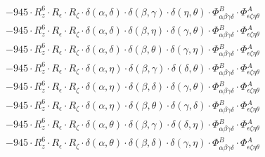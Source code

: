 \documentclass{article}
\begin{document}
\begin{equation}
\begin{array}{c}
 \\[0.2em] 		 - 945 \cdot R_{z}^{6} \cdot R_{\epsilon{}} \cdot R_{\zeta{}} \cdot \delta{}\left(\alpha{}, \delta{}\right) \cdot \delta{}\left(\beta{}, \gamma{}\right) \cdot \delta{}\left(\eta{}, \theta{}\right) \cdot \Phi{}^{B}_{\alpha{}\beta{}\gamma{}\delta{}} \cdot \Phi{}^{A}_{\epsilon{}\zeta{}\eta{}\theta{}} 
 \\[0.2em] 		 - 945 \cdot R_{z}^{6} \cdot R_{\epsilon{}} \cdot R_{\zeta{}} \cdot \delta{}\left(\alpha{}, \delta{}\right) \cdot \delta{}\left(\beta{}, \eta{}\right) \cdot \delta{}\left(\gamma{}, \theta{}\right) \cdot \Phi{}^{B}_{\alpha{}\beta{}\gamma{}\delta{}} \cdot \Phi{}^{A}_{\epsilon{}\zeta{}\eta{}\theta{}} 
 \\[0.2em] 		 - 945 \cdot R_{z}^{6} \cdot R_{\epsilon{}} \cdot R_{\zeta{}} \cdot \delta{}\left(\alpha{}, \delta{}\right) \cdot \delta{}\left(\beta{}, \theta{}\right) \cdot \delta{}\left(\gamma{}, \eta{}\right) \cdot \Phi{}^{B}_{\alpha{}\beta{}\gamma{}\delta{}} \cdot \Phi{}^{A}_{\epsilon{}\zeta{}\eta{}\theta{}} 
 \\[0.2em] 		 - 945 \cdot R_{z}^{6} \cdot R_{\epsilon{}} \cdot R_{\zeta{}} \cdot \delta{}\left(\alpha{}, \eta{}\right) \cdot \delta{}\left(\beta{}, \gamma{}\right) \cdot \delta{}\left(\delta{}, \theta{}\right) \cdot \Phi{}^{B}_{\alpha{}\beta{}\gamma{}\delta{}} \cdot \Phi{}^{A}_{\epsilon{}\zeta{}\eta{}\theta{}} 
 \\[0.2em] 		 - 945 \cdot R_{z}^{6} \cdot R_{\epsilon{}} \cdot R_{\zeta{}} \cdot \delta{}\left(\alpha{}, \eta{}\right) \cdot \delta{}\left(\beta{}, \delta{}\right) \cdot \delta{}\left(\gamma{}, \theta{}\right) \cdot \Phi{}^{B}_{\alpha{}\beta{}\gamma{}\delta{}} \cdot \Phi{}^{A}_{\epsilon{}\zeta{}\eta{}\theta{}} 
 \\[0.2em] 		 - 945 \cdot R_{z}^{6} \cdot R_{\epsilon{}} \cdot R_{\zeta{}} \cdot \delta{}\left(\alpha{}, \eta{}\right) \cdot \delta{}\left(\beta{}, \theta{}\right) \cdot \delta{}\left(\gamma{}, \delta{}\right) \cdot \Phi{}^{B}_{\alpha{}\beta{}\gamma{}\delta{}} \cdot \Phi{}^{A}_{\epsilon{}\zeta{}\eta{}\theta{}} 
 \\[0.2em] 		 - 945 \cdot R_{z}^{6} \cdot R_{\epsilon{}} \cdot R_{\zeta{}} \cdot \delta{}\left(\alpha{}, \theta{}\right) \cdot \delta{}\left(\beta{}, \gamma{}\right) \cdot \delta{}\left(\delta{}, \eta{}\right) \cdot \Phi{}^{B}_{\alpha{}\beta{}\gamma{}\delta{}} \cdot \Phi{}^{A}_{\epsilon{}\zeta{}\eta{}\theta{}} 
 \\[0.2em] 		 - 945 \cdot R_{z}^{6} \cdot R_{\epsilon{}} \cdot R_{\zeta{}} \cdot \delta{}\left(\alpha{}, \theta{}\right) \cdot \delta{}\left(\beta{}, \delta{}\right) \cdot \delta{}\left(\gamma{}, \eta{}\right) \cdot \Phi{}^{B}_{\alpha{}\beta{}\gamma{}\delta{}} \cdot \Phi{}^{A}_{\epsilon{}\zeta{}\eta{}\theta{}} 

\end{array}
\end{equation}
\end{document}
